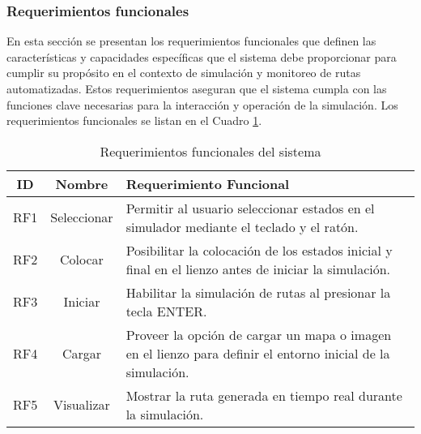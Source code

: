 \subsubsection{Requerimientos funcionales} %

    En esta secci\'on se presentan los requerimientos funcionales que definen las 
        caracter\'isticas y capacidades espec\'ificas que el sistema debe proporcionar 
        para cumplir su prop\'osito en el contexto de simulaci\'on y monitoreo de rutas 
        automatizadas. Estos requerimientos aseguran que el sistema cumpla con las 
        funciones clave necesarias para la interacci\'on y operaci\'on de la simulaci\'on.
        Los requerimientos funcionales se listan en el Cuadro \ref{tab:requerimientos_funcionales}.
    \vskip 0.5cm
    \begin{table}[h!]
        \centering
        \begin{tabular}{|c|c|p{12cm}|}
        \hline
        \textbf{ID} & \textbf{Nombre} & \textbf{Requerimiento Funcional} \\
        \hline
        RF1 & Seleccionar  & Permitir al usuario seleccionar estados en el simulador mediante el teclado y el rat\'on. \\
        \hline
        RF2 & Colocar & Posibilitar la colocaci\'on de los estados inicial y final en el lienzo antes de iniciar la simulaci\'on. \\
        \hline
        RF3 & Iniciar & Habilitar la simulaci\'on de rutas al presionar la tecla ENTER. \\
        \hline
        RF4 & Cargar & Proveer la opci\'on de cargar un mapa o imagen en el lienzo para definir el entorno inicial de la simulaci\'on. \\
        \hline
        RF5 & Visualizar & Mostrar la ruta generada en tiempo real durante la simulaci\'on. \\
        \hline
        \end{tabular}
        \caption{Requerimientos funcionales del sistema}
        \label{tab:requerimientos_funcionales}
    \end{table}